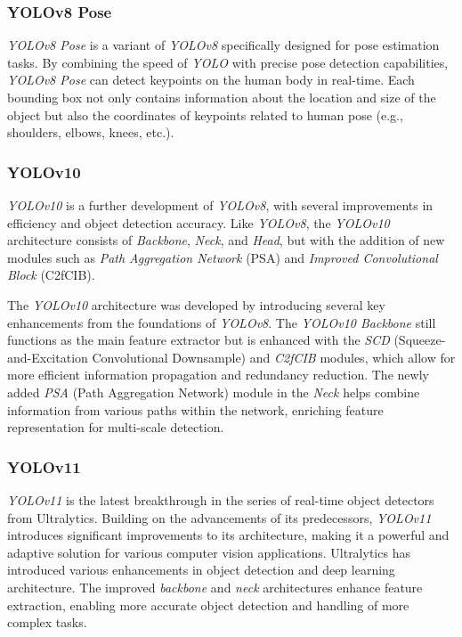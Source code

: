 \vspace{5pt}
\subsubsection{YOLOv8 Pose}
\label{subsubsec: YOLOv8 Pose}

\emph{YOLOv8 Pose} is a variant of \emph{YOLOv8} specifically designed for pose estimation tasks. By combining the speed of \emph{YOLO} with precise pose detection capabilities, \emph{YOLOv8 Pose} can detect keypoints on the human body in real-time. Each bounding box not only contains information about the location and size of the object but also the coordinates of keypoints related to human pose (e.g., shoulders, elbows, knees, etc.).

\vspace{5pt}
\subsubsection{YOLOv10}
\label{subsubsec:YOLOv10}

\emph{YOLOv10} is a further development of \emph{YOLOv8}, with several improvements in efficiency and object detection accuracy. Like \emph{YOLOv8}, the \emph{YOLOv10} architecture consists of \emph{Backbone}, \emph{Neck}, and \emph{Head}, but with the addition of new modules such as \emph{Path Aggregation Network} (PSA) and \emph{Improved Convolutional Block} (C2fCIB).

The \emph{YOLOv10} architecture was developed by introducing several key enhancements from the foundations of \emph{YOLOv8}. The \emph{YOLOv10 Backbone} still functions as the main feature extractor but is enhanced with the \emph{SCD} (Squeeze-and-Excitation Convolutional Downsample) and \emph{C2fCIB} modules, which allow for more efficient information propagation and redundancy reduction. The newly added \emph{PSA} (Path Aggregation Network) module in the \emph{Neck} helps combine information from various paths within the network, enriching feature representation for multi-scale detection.

\vspace{5pt}
\subsubsection{YOLOv11}
\label{subsubsec:YOLOv11}

\emph{YOLOv11} is the latest breakthrough in the series of real-time object detectors from Ultralytics. Building on the advancements of its predecessors, \emph{YOLOv11} introduces significant improvements to its architecture, making it a powerful and adaptive solution for various computer vision applications. Ultralytics has introduced various enhancements in object detection and deep learning architecture. The improved \emph{backbone} and \emph{neck} architectures enhance feature extraction, enabling more accurate object detection and handling of more complex tasks.

